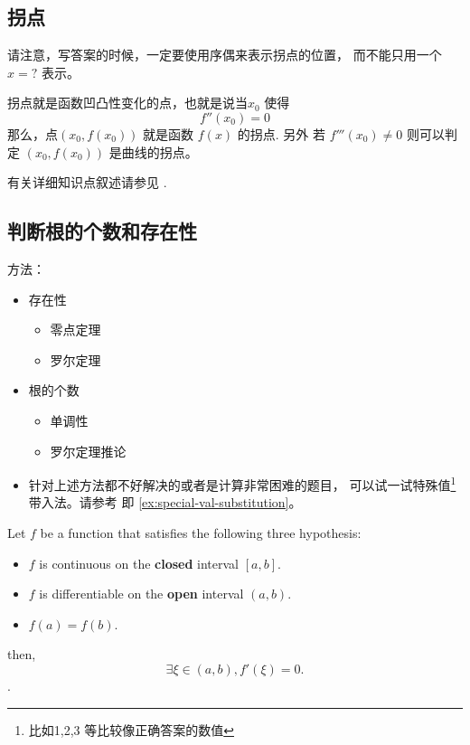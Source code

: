 \subsection{拐点}

请注意，写答案的时候，一定要使用序偶来表示拐点的位置，
而不能只用一个 $x=?$ 表示。

拐点就是函数凹凸性变化的点，也就是说当$x_0$ 使得
\[
    f''(x_0) = 0
\]
那么，点$(x_0, f(x_0))$ 就是函数 $f(x)$ 的拐点.
另外 若 $f'''(x_0) \neq 0$ 则可以判定 $(x_0, f(x_0))$ 是曲线的拐点。

有关详细知识点叙述请参见 \cite[page 69, pdf 80]{we}.

\subsection{判断根的个数和存在性}

方法：
\begin{itemize} 
    \item 存在性
    \begin{itemize}
        \item 零点定理
        \item 罗尔定理
    \end{itemize}

    \item 根的个数
    \begin{itemize}
        \item 单调性
        \item 罗尔定理推论
    \end{itemize}

    \item   针对上述方法都不好解决的或者是计算非常困难的题目，
            可以试一试特殊值\footnote{比如1,2,3 等比较像正确答案的数值}
            带入法。请参考 \cite[page 77, pdf 88, 例4]{we} 即
            \ref{ex:special-val-substitution}。

\end{itemize}

\begin{theorem}  \label{rolle-mean-value}
    Let $f$ be a function that satisfies the following three hypothesis:
    \begin{itemize}
        \item $f$ is continuous on the \textbf{closed} interval $[a, b]$.
        \item $f$ is differentiable on the \textbf{open} interval $(a, b)$.
        \item $f(a) = f(b)$.
    \end{itemize}
    then, 
    \[
        \exists \xi \in (a, b), f'(\xi) = 0.
    \]
    \cite[page 290, pdf 325]{stewart}.
\end{theorem}

